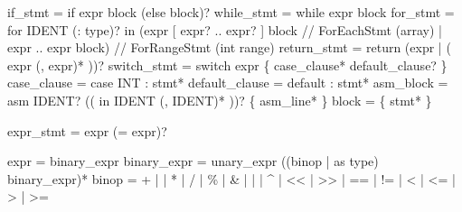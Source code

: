 \documentclass[
  11pt,
]{article}
\newenvironment{Shaded}{\begin{snugshade}}{\end{snugshade}}
\newcommand{\NormalTok}[1]{#1}
\begin{document}
\begin{Shaded}
\begin{Highlighting}[]
\NormalTok{if\_stmt        = \textquotesingle{}if\textquotesingle{} expr block (\textquotesingle{}else\textquotesingle{} block)?}
\NormalTok{while\_stmt     = \textquotesingle{}while\textquotesingle{} expr block}
\NormalTok{for\_stmt       = \textquotesingle{}for\textquotesingle{} IDENT (\textquotesingle{}:\textquotesingle{} type)? \textquotesingle{}in\textquotesingle{}}
\NormalTok{                 (expr \textquotesingle{}[\textquotesingle{} expr? \textquotesingle{}..\textquotesingle{} expr? \textquotesingle{}]\textquotesingle{} block   // ForEachStmt (array)}
\NormalTok{                 | expr \textquotesingle{}..\textquotesingle{} expr block)                  // ForRangeStmt (int range)}
\NormalTok{return\_stmt    = \textquotesingle{}return\textquotesingle{} (expr | \textquotesingle{}(\textquotesingle{} expr (\textquotesingle{},\textquotesingle{} expr)* \textquotesingle{})\textquotesingle{})?}
\NormalTok{switch\_stmt    = \textquotesingle{}switch\textquotesingle{} expr \textquotesingle{}\{\textquotesingle{} case\_clause* default\_clause? \textquotesingle{}\}\textquotesingle{}}
\NormalTok{case\_clause    = \textquotesingle{}case\textquotesingle{} INT \textquotesingle{}:\textquotesingle{} stmt*}
\NormalTok{default\_clause = \textquotesingle{}default\textquotesingle{} \textquotesingle{}:\textquotesingle{} stmt*}
\NormalTok{asm\_block      = \textquotesingle{}asm\textquotesingle{} IDENT? (\textquotesingle{}(\textquotesingle{} \textquotesingle{}in\textquotesingle{} IDENT (\textquotesingle{},\textquotesingle{} IDENT)* \textquotesingle{})\textquotesingle{})? \textquotesingle{}\{\textquotesingle{} asm\_line* \textquotesingle{}\}\textquotesingle{}}
\NormalTok{block          = \textquotesingle{}\{\textquotesingle{} stmt* \textquotesingle{}\}\textquotesingle{}}

\NormalTok{expr\_stmt      = expr (\textquotesingle{}=\textquotesingle{} expr)?}

\NormalTok{expr           = binary\_expr}
\NormalTok{binary\_expr    = unary\_expr ((binop | \textquotesingle{}as\textquotesingle{} type) binary\_expr)*}
\NormalTok{binop          = \textquotesingle{}+\textquotesingle{} | \textquotesingle{}{-}\textquotesingle{} | \textquotesingle{}*\textquotesingle{} | \textquotesingle{}/\textquotesingle{} | \textquotesingle{}\%\textquotesingle{} | \textquotesingle{}\&\textquotesingle{} | \textquotesingle{}|\textquotesingle{} | \textquotesingle{}\^{}\textquotesingle{}}
\NormalTok{               | \textquotesingle{}\textless{}\textless{}\textquotesingle{} | \textquotesingle{}\textgreater{}\textgreater{}\textquotesingle{} | \textquotesingle{}==\textquotesingle{} | \textquotesingle{}!=\textquotesingle{} | \textquotesingle{}\textless{}\textquotesingle{} | \textquotesingle{}\textless{}=\textquotesingle{} | \textquotesingle{}\textgreater{}\textquotesingle{} | \textquotesingle{}\textgreater{}=\textquotesingle{}}


\end{Highlighting}
\end{Shaded}
\end{document}
